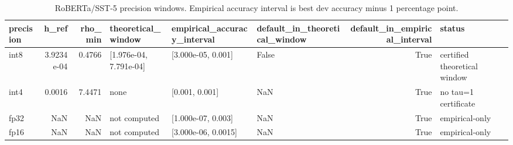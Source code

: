 \begin{table}[t]
\centering
\begin{tabular}{lrrlllrl}
\toprule
precision & h\_ref & rho\_min & theoretical\_window & empirical\_accuracy\_interval & default\_in\_theoretical\_window & default\_in\_empirical\_interval & status \\
\midrule
int8 & 3.9234e-04 & 0.4766 & [1.976e-04, 7.791e-04] & [3.000e-05, 0.001] & False & True & certified theoretical window \\
int4 & 0.0016 & 7.4471 & none & [0.001, 0.001] & NaN & True & no tau=1 certificate \\
fp32 & NaN & NaN & not computed & [1.000e-07, 0.003] & NaN & True & empirical-only \\
fp16 & NaN & NaN & not computed & [3.000e-06, 0.0015] & NaN & True & empirical-only \\
\bottomrule
\end{tabular}

\caption{RoBERTa/SST-5 precision windows. Empirical accuracy interval is best dev accuracy minus 1 percentage point.}
\label{tab:precision_window_final}
\end{table}
